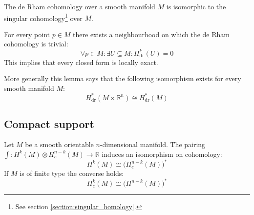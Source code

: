 	
	\begin{theorem}[de Rham]
		The de Rham cohomology over a smooth manifold $M$ is isomorphic to the singular cohomology\footnote{See section \ref{section:singular_homology}.} over $M$.
	\end{theorem}
	
	\begin{theorem}\label{forms:theorem:poincare}
		 For every point $p\in M$ there exists a neighbourhood on which the de Rham cohomology is trivial:
		\begin{equation}
			\forall p\in M:\exists U\subseteq M: H^k_{\text{dr}}(U) = 0
		\end{equation}
		This implies that every closed form is locally exact.
		
		More generally this lemma says that the following isomorphism exists for every smooth manifold $M$:
		\begin{equation}
			H^*_{\text{dr}}(M\times\mathbb{R}^n) \cong H^*_{\text{dr}}(M)
		\end{equation}
	\end{theorem}

\subsection{Compact support}

	\begin{theorem}
		Let $M$ be a smooth orientable $n$-dimensional manifold. The pairing $\int:H^k(M)\otimes H^{n-k}_c(M)\rightarrow\mathbb{R}$ induces an isomorphism on cohomology:
		\begin{equation}
			H^k(M)\cong\Big(H^{n-k}_c(M)\Big)^*
		\end{equation}
		If $M$ is of finite type the converse holds:
		\begin{equation}
			H^k_c(M)\cong\Big(H^{n-k}(M)\Big)^*
		\end{equation}
	\end{theorem}

